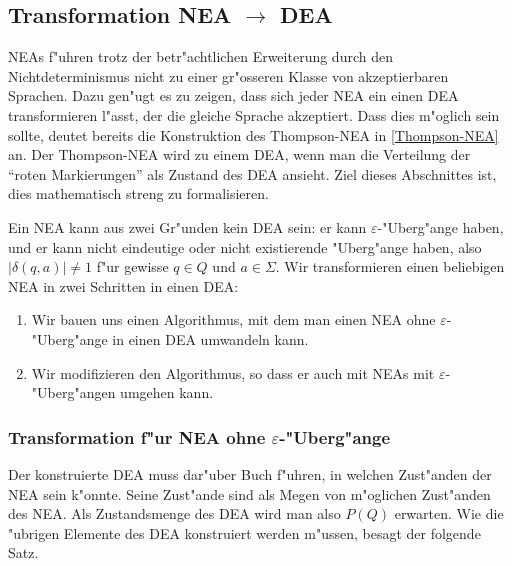 \subsection{Transformation NEA $\rightarrow$ DEA}
NEAs f"uhren trotz der betr"achtlichen Erweiterung durch den
Nichtdeterminismus nicht zu einer gr"osseren Klasse von akzeptierbaren
Sprachen. Dazu gen"ugt es zu zeigen, dass sich jeder NEA ein einen DEA
transformieren l"asst, der die gleiche Sprache akzeptiert.
Dass dies m"oglich sein sollte, deutet bereits die Konstruktion
des Thompson-NEA in \ref{Thompson-NEA} an. Der Thompson-NEA
wird zu einem DEA, wenn man die Verteilung der ``roten Markierungen''
als Zustand des DEA ansieht. Ziel dieses Abschnittes ist, dies
mathematisch streng zu formalisieren.

Ein NEA kann aus zwei Gr"unden kein DEA sein:
er kann $\varepsilon$-"Uberg"ange haben, und er kann nicht eindeutige
oder nicht existierende "Uberg"ange haben, also $|\delta(q,a)|\ne 1$
f"ur gewisse $q\in Q$ und $a\in\Sigma$.  Wir transformieren einen 
beliebigen NEA in zwei Schritten in einen DEA:
\begin{enumerate}
\item Wir bauen uns einen Algorithmus, mit dem man einen NEA ohne
$\varepsilon$-"Uberg"ange in einen DEA umwandeln kann.
\item Wir modifizieren den Algorithmus, so dass er auch mit NEAs mit
$\varepsilon$-"Uberg"angen umgehen kann.
\end{enumerate}

\subsubsection{Transformation f"ur NEA ohne $\varepsilon$-"Uberg"ange}
Der konstruierte DEA muss dar"uber Buch f"uhren, in welchen Zust"anden
der NEA sein k"onnte. Seine Zust"ande sind als Megen von m"oglichen
Zust"anden des NEA. Als Zustandsmenge des DEA wird man also $P(Q)$ 
erwarten. Wie die "ubrigen Elemente des DEA konstruiert werden m"ussen,
besagt der folgende Satz.

